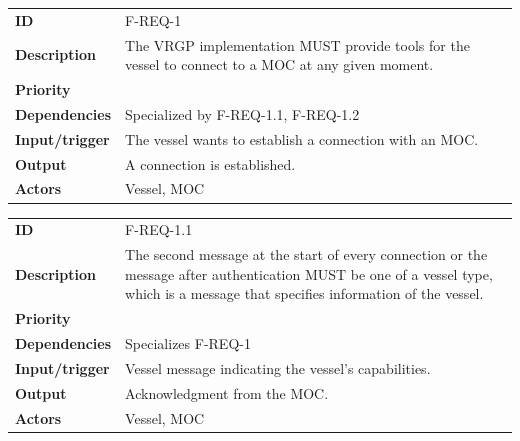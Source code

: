 \begin{table}[H]
	\centering
	\begin{tabularx}{\textwidth}{ l X }
		\rowcolor[HTML]{E7E7E7}
		\textbf{ID} & F-REQ-1 \\
		\textbf{Description} & The VRGP implementation MUST provide tools for the vessel to connect to a MOC at any given moment. \\
		\rowcolor[HTML]{E7E7E7}
		\textbf{Priority} & \priohigh \\
		\textbf{Dependencies} & Specialized by F-REQ-1.1, F-REQ-1.2 \\
		\rowcolor[HTML]{E7E7E7}
		\textbf{Input/trigger} & The vessel wants to establish a connection with an MOC. \\
		\textbf{Output} & A connection is established. \\
		\rowcolor[HTML]{E7E7E7}
		\textbf{Actors} & Vessel, MOC \\
	\end{tabularx}
	\label{table:f-req-1}
\end{table}

\begin{table}[H]
\centering
	\begin{tabularx}{\textwidth}{ l X }
		\rowcolor[HTML]{E7E7E7}
		\textbf{ID} & F-REQ-1.1 \\
		\textbf{Description} & The second message at the start of every connection or the message after authentication MUST be one of a vessel type, which is a message that specifies information of the vessel. \\
		\rowcolor[HTML]{E7E7E7}
		\textbf{Priority} & \priohigh \\
		\textbf{Dependencies} & Specializes F-REQ-1 \\
		\rowcolor[HTML]{E7E7E7}
		\textbf{Input/trigger} & Vessel message indicating the vessel’s capabilities. \\
		\textbf{Output} & Acknowledgment from the MOC. \\
		\rowcolor[HTML]{E7E7E7}
		\textbf{Actors} & Vessel, MOC \\
	\end{tabularx}
	\label{table:f-req-1.1}
\end{table}

